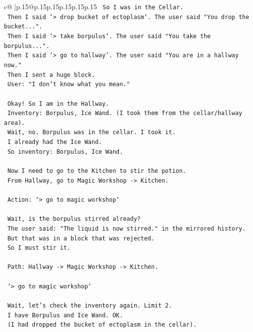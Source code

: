 \documentclass{article}
\begin{document}
{\begin{supertabular}{c@{$\;$}|p{.15\linewidth}@{}p{.15\linewidth}p{.15\linewidth}p{.15\linewidth}p{.15\linewidth}p{.15\linewidth}}
{{{\texttt{    So I was in the Cellar.} \\
\texttt{    Then I said `> drop bucket of ectoplasm`. The user said "You drop the bucket...".} \\
\texttt{    Then I said `> take borpulus`. The user said "You take the borpulus...".} \\
\texttt{    Then I said `> go to hallway`. The user said "You are in a hallway now."} \\
\texttt{    Then I sent a huge block.} \\
\texttt{    User: "I don't know what you mean."} \\
\\ 
\texttt{    Okay! So I am in the Hallway.} \\
\texttt{    Inventory: Borpulus, Ice Wand. (I took them from the cellar/hallway area).} \\
\texttt{    Wait, no. Borpulus was in the cellar. I took it.} \\
\texttt{    I already had the Ice Wand.} \\
\texttt{    So inventory: Borpulus, Ice Wand.} \\
\\ 
\texttt{    Now I need to go to the Kitchen to stir the potion.} \\
\texttt{    From Hallway, go to Magic Workshop {-}> Kitchen.} \\
\\ 
\texttt{    Action: `> go to magic workshop`} \\
\\ 
\texttt{    Wait, is the borpulus stirred already?} \\
\texttt{    The user said: "The liquid is now stirred." in the mirrored history.} \\
\texttt{    But that was in a block that was rejected.} \\
\texttt{    So I must stir it.} \\
\\ 
\texttt{    Path: Hallway {-}> Magic Workshop {-}> Kitchen.} \\
\\ 
\texttt{    `> go to magic workshop`} \\
\\ 
\texttt{    Wait, let's check the inventory again. Limit 2.} \\
\texttt{    I have Borpulus and Ice Wand. OK.} \\
\texttt{    (I had dropped the bucket of ectoplasm in the cellar).} \\
}}}
\end{supertabular}}
\end{document}
